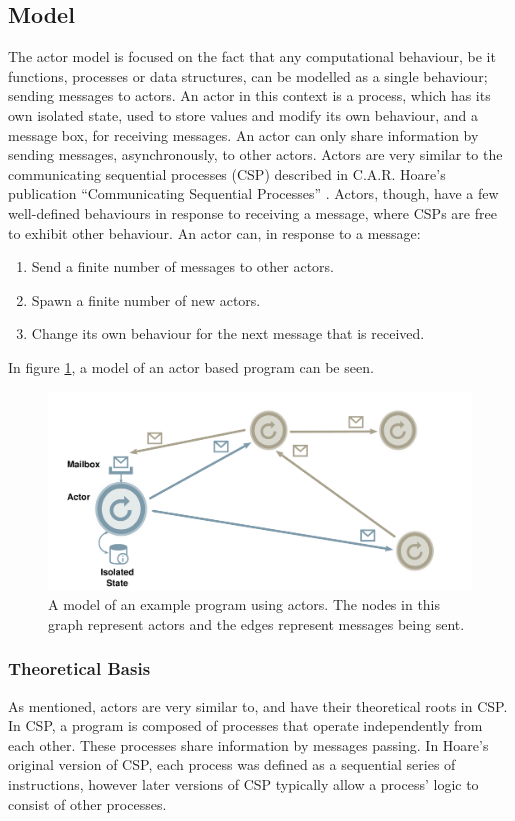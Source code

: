 \subsection{Model}
The actor model is focused on the fact that any computational behaviour, be it functions, processes or data structures, can be modelled as a single behaviour; sending messages to actors.
An actor in this context is a process, which has its own isolated state, used to store values and modify its own behaviour, and a message box, for receiving messages. An actor can only share information by sending messages, asynchronously, to other actors.
Actors are very similar to the communicating sequential processes (CSP) described in C.A.R. Hoare's publication \enquote{Communicating Sequential Processes} \cite{hoare1985communicating}. Actors, though, have a few well-defined behaviours in response to receiving a message, where CSPs are free to exhibit other behaviour. An actor can, in response to a message: 

\begin{enumerate}
  \item Send a finite number of messages to other actors.
  \item Spawn a finite number of new actors.
  \item Change its own behaviour for the next message that is received.
\end{enumerate}

In figure \ref{fig:actor}, a model of an actor based program can be seen.

\begin{figure}[htbp]
  \centering
  \includegraphics[width=\textwidth]{Images/actors.pdf}
  \caption{A model of an example program using actors. The nodes in this graph represent actors and the edges represent messages being sent.}
  \label{fig:actor}
\end{figure}

\subsubsection{Theoretical Basis} 
As mentioned, actors are very similar to, and have their theoretical roots in CSP.
In CSP, a program is composed of processes that operate independently from each other. These processes share information by messages passing. In Hoare's original version of CSP, each process was defined as a sequential series of instructions, however later versions of CSP typically allow a process' logic to consist of other processes.

